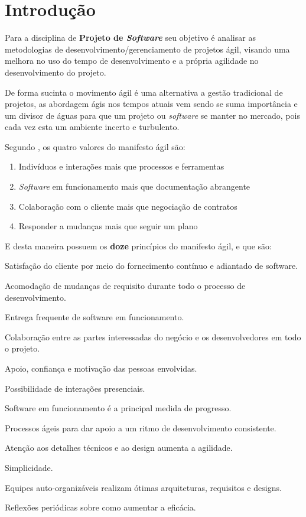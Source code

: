 
\section{Introdução}

\par Para a disciplina de \textbf{Projeto de \textit{Software}} seu objetivo é analisar as metodologias de desenvolvimento/gerenciamento de projetos ágil, visando uma melhora no uso do tempo de desenvolvimento e a própria agilidade no desenvolvimento do projeto.
\par De forma sucinta o movimento ágil é uma alternativa a gestão tradicional de projetos, as abordagem ágis nos tempos atuais vem sendo se suma importância e um divisor de águas para que um projeto ou \textit{software} se manter no mercado, pois cada vez esta um ambiente incerto e turbulento.
\par Segundo , os quatro valores do manifesto ágil são:

 \begin{enumerate}[label=\Roman{*}, ref=(\roman{*})]
   \item Indivíduos e interações mais que processos e ferramentas
   \item \textit{Software} em funcionamento mais que documentação abrangente
   \item Colaboração com o cliente mais que negociação de contratos
   \item Responder a mudanças mais que seguir um plano
 \end{enumerate}
 \par E desta maneira possuem os \textbf{doze} princípios do manifesto ágil, e que são:
\begin{asparaenum}
  \item Satisfação do cliente por meio do fornecimento contínuo e adiantado de software.
  \item Acomodação de mudanças de requisito durante todo o processo de desenvolvimento.
  \item Entrega frequente de software em funcionamento.
  \item Colaboração entre as partes interessadas do negócio e os desenvolvedores em todo o projeto.
  \item Apoio, confiança e motivação das pessoas envolvidas.
  \item Possibilidade de interações presenciais.
  \item Software em funcionamento é a principal medida de progresso.
  \item Processos ágeis para dar apoio a um ritmo de desenvolvimento consistente.
  \item Atenção aos detalhes técnicos e ao design aumenta a agilidade.
  \item Simplicidade.
  \item Equipes auto-organizáveis realizam ótimas arquiteturas, requisitos e designs.
  \item Reflexões periódicas sobre como aumentar a eficácia.

  \cite{smartsheet}
\end{asparaenum}

